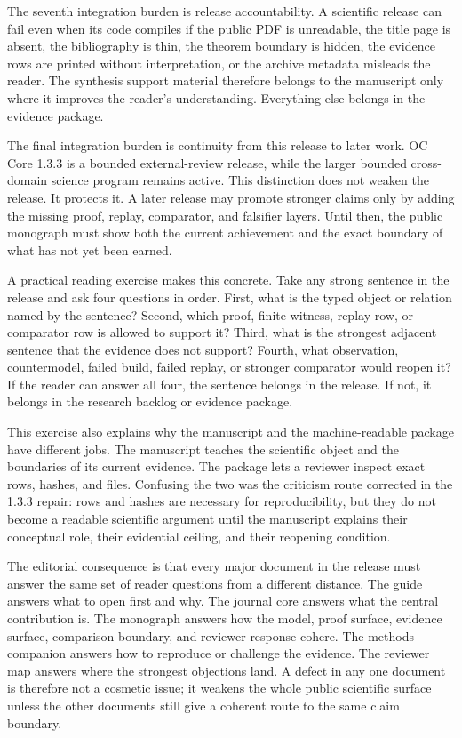 The seventh integration burden is release accountability. A scientific release can fail even when its code compiles if the public PDF is unreadable, the title page is absent, the bibliography is thin, the theorem boundary is hidden, the evidence rows are printed without interpretation, or the archive metadata misleads the reader. The synthesis support material therefore belongs to the manuscript only where it improves the reader's understanding. Everything else belongs in the evidence package.


The final integration burden is continuity from this release to later work. OC Core 1.3.3 is a bounded external-review release, while the larger bounded cross-domain science program remains active. This distinction does not weaken the release. It protects it. A later release may promote stronger claims only by adding the missing proof, replay, comparator, and falsifier layers. Until then, the public monograph must show both the current achievement and the exact boundary of what has not yet been earned.


A practical reading exercise makes this concrete. Take any strong sentence in the release and ask four questions in order. First, what is the typed object or relation named by the sentence? Second, which proof, finite witness, replay row, or comparator row is allowed to support it? Third, what is the strongest adjacent sentence that the evidence does not support? Fourth, what observation, countermodel, failed build, failed replay, or stronger comparator would reopen it? If the reader can answer all four, the sentence belongs in the release. If not, it belongs in the research backlog or evidence package.


This exercise also explains why the manuscript and the machine-readable package have different jobs. The manuscript teaches the scientific object and the boundaries of its current evidence. The package lets a reviewer inspect exact rows, hashes, and files. Confusing the two was the criticism route corrected in the 1.3.3 repair: rows and hashes are necessary for reproducibility, but they do not become a readable scientific argument until the manuscript explains their conceptual role, their evidential ceiling, and their reopening condition.


The editorial consequence is that every major document in the release must answer the same set of reader questions from a different distance. The guide answers what to open first and why. The journal core answers what the central contribution is. The monograph answers how the model, proof surface, evidence surface, comparison boundary, and reviewer response cohere. The methods companion answers how to reproduce or challenge the evidence. The reviewer map answers where the strongest objections land. A defect in any one document is therefore not a cosmetic issue; it weakens the whole public scientific surface unless the other documents still give a coherent route to the same claim boundary.


